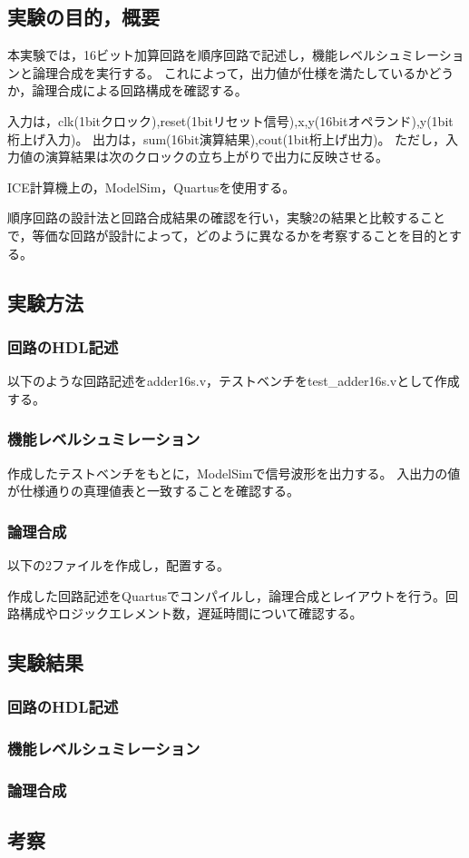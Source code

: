 
\subsection{実験の目的，概要}
本実験では，16ビット加算回路を順序回路で記述し，機能レベルシュミレーションと論理合成を実行する。
これによって，出力値が仕様を満たしているかどうか，論理合成による回路構成を確認する。

入力は，clk(1bitクロック),reset(1bitリセット信号),x,y(16bitオペランド),y(1bit桁上げ入力)。
出力は，sum(16bit演算結果),cout(1bit桁上げ出力)。
ただし，入力値の演算結果は次のクロックの立ち上がりで出力に反映させる。

ICE計算機上の，ModelSim，Quartusを使用する。

順序回路の設計法と回路合成結果の確認を行い，実験2の結果と比較することで，等価な回路が設計によって，どのように異なるかを考察することを目的とする。

\subsection{実験方法}
\subsubsection{回路のHDL記述}
以下のような回路記述をadder16s.v，テストベンチをtest\_adder16s.vとして作成する。



\subsubsection{機能レベルシュミレーション}
作成したテストベンチをもとに，ModelSimで信号波形を出力する。
入出力の値が仕様通りの真理値表と一致することを確認する。

\subsubsection{論理合成}
以下の2ファイルを作成し，配置する。



作成した回路記述をQuartusでコンパイルし，論理合成とレイアウトを行う。回路構成やロジックエレメント数，遅延時間について確認する。
 
\subsection{実験結果}
\subsubsection{回路のHDL記述}
\subsubsection{機能レベルシュミレーション}
\subsubsection{論理合成}
\subsection{考察}

